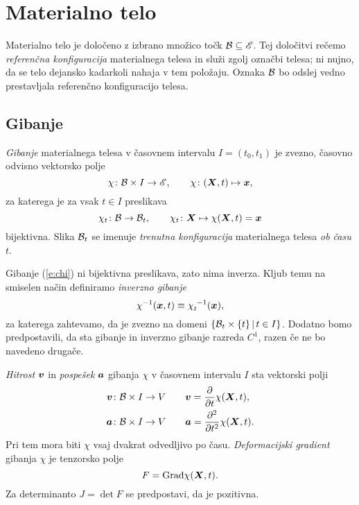 \chapter{Materialno telo}


Materialno telo je določeno z izbrano množico točk $\mathcal B\subseteq\mathscr E$. Tej določitvi rečemo
\emph{referenčna konfiguracija} materialnega telesa in služi zgolj označbi telesa; ni nujno,
da se telo dejansko kadarkoli nahaja v tem položaju. Oznaka $\mathcal B$ bo odslej vedno prestavljala
referenčno konfiguracijo telesa.


\section{Gibanje}


\begin{definicija}
	\emph{Gibanje} materialnega telesa v časovnem
	intervalu $I=(t_0,t_1)$ je zvezno, časovno odvisno vektorsko polje
	\begin{equation}\label{e:chi}
		\chi\colon\mathcal B\times I\to\mathscr E,\qquad \chi\colon (\boldsymbol X,t)\mapsto\boldsymbol x,
	\end{equation}
	za katerega je za vsak $t\in I$ preslikava
	\[ \chi_t\colon\mathcal B\to\mathcal B_t, \qquad \chi_t\colon\boldsymbol X\mapsto\chi(\boldsymbol X,t)=\boldsymbol x \]
	bijektivna. Slika $\mathcal B_t$ se imenuje \emph{trenutna konfiguracija} materialnega
	telesa \emph{ob času} $t$.
\end{definicija}
Gibanje (\ref{e:chi}) ni bijektivna preslikava, zato nima inverza. Kljub temu na smiselen
način definiramo \emph{inverzno gibanje}
\[ \chi^{-1}(\vek{x},t)\equiv\bottop{\chi}{t}{-1}(\vek{x}), \]
za katerega zahtevamo, da je zvezno na domeni $\{\mathcal B_t\times\{t\}\,|\,t\in I\}$.
Dodatno bomo predpostavili, da sta gibanje in inverzno gibanje razreda $C^1$, razen če ne bo navedeno drugače.


\emph{Hitrost} $\boldsymbol v$ in \emph{pospešek} $\boldsymbol a$ gibanja $\chi$ v časovnem intervalu $I$ sta vektorski polji
\begin{align}
	\boldsymbol v\colon\mathcal B\times I\to V \qquad & \boldsymbol v = \frac{\partial}{\partial t}\chi(\boldsymbol X,t), \label{e:v} \\
	\boldsymbol a\colon\mathcal B\times I\to V \qquad & \boldsymbol a = \frac{\partial^2}{\partial t^2}\chi(\boldsymbol X,t). \label{e:a}
\end{align}
Pri tem mora biti $\chi$ vsaj dvakrat odvedljivo po času. \emph{Deformacijski gradient} gibanja $\chi$ je
tenzorsko polje
\begin{equation} \label{e:F} F=\mathrm{Grad}\chi(\boldsymbol X,t). \end{equation}
Za determinanto $J=\det F$ se predpostavi, da je pozitivna.


